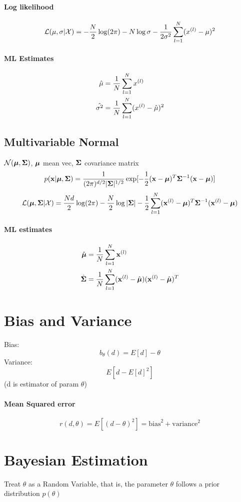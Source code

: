     \paragraph{Log likelihood} \[\mathcal{L}(\mu, \sigma|\mathcal{X}) = -\frac{N}{2}\log(2\pi) - N\log\sigma -
    \frac{1}{2\sigma^2}\sum_{l=1}^N(x^{(l)} - \mu)^2\]
    \paragraph{ML Estimates} \begin{align*}
        \hat{\mu} &= \frac{1}{N}\sum_{l=1}^N x^{(l)}\\
        \hat{\sigma^2} &= \frac{1}{N}\sum_{l=1}^N (x^{(l)} - \hat{\mu})^2 \end{align*}
\subsection{Multivariable Normal} $\mathcal{N}(\boldsymbol\mu,\boldsymbol\Sigma)$, $\boldsymbol\mu$ mean vec, $\boldsymbol\Sigma$
    covariance matrix
 \[p(\mathbf{x}|\boldsymbol\mu, \boldsymbol\Sigma) = \frac{1}{(2\pi)^{d/2}|\boldsymbol\Sigma|^{1/2}}
     \exp[-\frac{1}{2}(\mathbf{x} -\boldsymbol\mu)^T\boldsymbol\Sigma^{-1}(\mathbf{x} - \boldsymbol\mu)]\]
\[\mathcal{L} (\boldsymbol\mu,\boldsymbol\Sigma|\mathcal{X}) = \frac{Nd}{2}\log(2\pi) - \frac{N}{2}\log|\boldsymbol\Sigma|
-\frac{1}{2}\sum_{l=1}^N(\mathbf{x}^{(l)} - \boldsymbol\mu)^T\boldsymbol\Sigma^{-1}(\mathbf{x}^{(l)} - \boldsymbol\mu)\]
\paragraph{ML estimates} \begin{align*}\hat{\boldsymbol\mu} &= \frac{1}{N}\sum_{l=1}^N
    \mathbf{x}^{(l)} \\
    \hat{\boldsymbol\Sigma} &= \frac{1}{N}\sum_{l=1}^N(\mathbf{x}^{(l)} - \hat{\boldsymbol\mu})(\mathbf{x}^{(l)} -
    \hat{\boldsymbol\mu})^T\end{align*}
\section{Bias and Variance} 
Bias: \[b_\theta(d) = E[d] - \theta\]
Variance: \[E[d-E[d]^2]\](d is estimator of param $\theta$)

\paragraph{Mean Squared error}
\[r(d,\theta) = E[(d-\theta)^2]= \mbox{bias}^2 + \mbox{variance}^2\]
\section{Bayesian Estimation} Treat $\theta$ as a Random Variable,  that
is, the parameter $\theta$ follows a prior distribution $p(\theta)$

